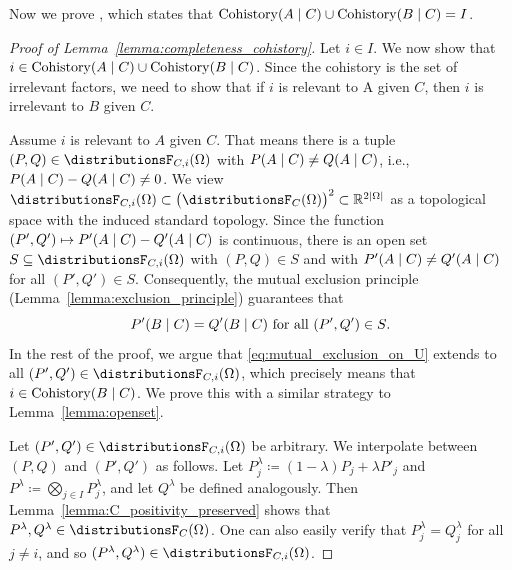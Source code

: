 \documentclass[USenglish,onecolumn]{article}
\begin{document}
Now we prove , which states that $\operatorname{Cohistory}(A\mid C)\cup \operatorname{Cohistory}(B\mid C)=I$.
\begin{proof}[Proof of Lemma~\ref{lemma:completeness_cohistory}]
  Let $i \in I$.
  We now show that $i \in \operatorname{Cohistory}(A \mid C) \cup \operatorname{Cohistory}(B \mid C)$.
  Since the cohistory is the set of irrelevant factors, we need to show that if $i$ is relevant to A given $C$, then  $i$ is irrelevant to $B$ given $C$.

  Assume $i$ is relevant to $A$ given $C$. That means there is a tuple $(P, Q) \in \distributionsF_{C, i}(\Omg)$ with $P(A \mid C) \neq Q(A \mid C)$, i.e., $P(A \mid C) - Q(A \mid C) \neq 0$.
  We view $\distributionsF_{C, i}(\Omega) \subset \big(\distributionsF_{C}(\Omg)\big)^2 \subset \mathbb{R}^{2 |\Omega|}$ as a topological space with the induced standard topology.
  Since the function $(P', Q') \mapsto P'(A \mid C) - Q'(A \mid C)$ is continuous, there is an open set $S \subseteq \distributionsF_{C, i}(\Omg)$ with $(P, Q) \in S$ and with $P'(A \mid C) \neq Q'(A \mid C)$ for all $(P', Q') \in S$.
  Consequently, the mutual exclusion principle (Lemma~\ref{lemma:exclusion_principle}) guarantees that
  \begin{equation}
  \label{eq:mutual_exclusion_on_U}
      P'(B \mid C) = Q'(B \mid C)\text{ for all $(P', Q') \in S$.}
  \end{equation}
  In the rest of the proof, we argue that \eqref{eq:mutual_exclusion_on_U} extends to all $(P', Q') \in \distributionsF_{C, i}(\Omg)$, which precisely means that $i \in \operatorname{Cohistory}(B \mid C)$.
  We prove this with a similar strategy to Lemma~\ref{lemma:openset}.

  Let $(P', Q') \in \distributionsF_{C, i}(\Omg)$ be arbitrary. We interpolate between $(P, Q)$ and $(P', Q')$ as follows.
  Let $P^{\lambda}_j \coloneq (1 - \lambda) P_j + \lambda P'_{j}$ and $P^{\lambda} \coloneq \bigotimes_{j \in I} P^{\lambda}_j$, and let $Q^{\lambda}$ be defined analogously.
  Then Lemma~\ref{lemma:C_positivity_preserved} shows that $P^{\lambda}, Q^{\lambda} \in \distributionsF_{C}(\Omg)$.
  One can also easily verify that $P^{\lambda}_j = Q^{\lambda}_j$ for all $j \neq i$, and so $(P^{\lambda}, Q^{\lambda}) \in \distributionsF_{C, i}(\Omg)$.


\end{proof}
\end{document}
